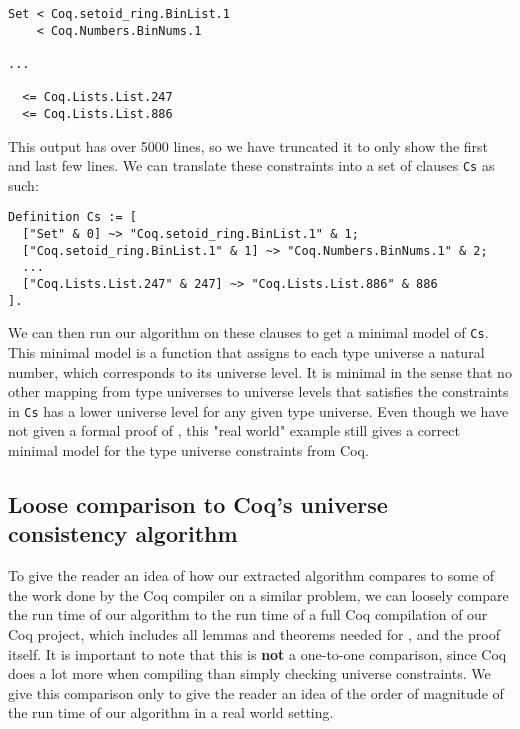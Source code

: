 \begin{minipage}{\linewidth}
\begin{lstlisting}[language=Coq, label={lst:universe_hierarchy}, caption={Universe hierarchy in \lstinline{Main.v}}]
Set < Coq.setoid_ring.BinList.1
    < Coq.Numbers.BinNums.1

...

  <= Coq.Lists.List.247
  <= Coq.Lists.List.886
\end{lstlisting}
\end{minipage}

This output has over 5000 lines, so we have truncated it to only show the first and last few lines.
We can translate these constraints into a set of clauses \lstinline{Cs} as such:

\begin{minipage}{\linewidth}
\begin{lstlisting}[language=Coq, label={lst:universe_hierarchy_clauses}, caption={Universe hierarchy as clauses}]
Definition Cs := [
  ["Set" & 0] ~> "Coq.setoid_ring.BinList.1" & 1;
  ["Coq.setoid_ring.BinList.1" & 1] ~> "Coq.Numbers.BinNums.1" & 2;
  ...
  ["Coq.Lists.List.247" & 247] ~> "Coq.Lists.List.886" & 886
].
\end{lstlisting}
\end{minipage}

We can then run our algorithm on these clauses to get a minimal model of \lstinline{Cs}.
This minimal model is a function that assigns to each type universe a natural number,
which corresponds to its universe level. It is minimal in the sense that no other mapping from
type universes to universe levels that satisfies the constraints in \lstinline{Cs} has a lower
universe level for any given type universe.
Even though we have not given a formal proof of ,
this "real world" example still gives a correct minimal model for the type universe constraints from Coq.

\subsection{Loose comparison to Coq's universe consistency algorithm}

To give the reader an idea of how our extracted algorithm compares to some of
the work done by the Coq compiler on a similar problem, we can
loosely compare the run time of our algorithm to the run time of
a full Coq compilation of our Coq project, which includes all
lemmas and theorems needed for , and the proof itself.
It is important to note that this is \textbf{not} a one-to-one comparison,
since Coq does a lot more when compiling than simply checking universe constraints.
We give this comparison only to give the reader an idea of the order of magnitude of the run time of our algorithm
in a real world setting.

